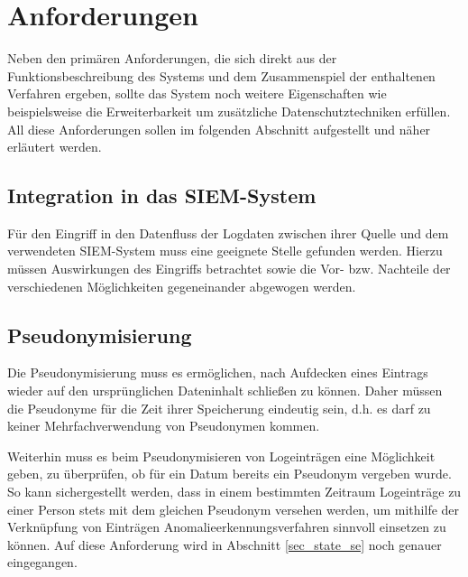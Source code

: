 \section{Anforderungen}

\label{sec_impl_requirements}

Neben den primären Anforderungen, die sich direkt aus der Funktionsbeschreibung des Systems und dem Zusammenspiel der enthaltenen Verfahren ergeben, sollte das System noch weitere Eigenschaften wie beispielsweise die Erweiterbarkeit um zusätzliche Datenschutztechniken erfüllen. All diese Anforderungen sollen im folgenden Abschnitt aufgestellt und näher erläutert werden.

\subsection{Integration in das SIEM-System}

\label{subsec_impl_requirements_ossimintegration}

Für den Eingriff in den Datenfluss der Logdaten zwischen ihrer Quelle und dem verwendeten SIEM-System muss eine geeignete Stelle gefunden werden. Hierzu müssen Auswirkungen des Eingriffs betrachtet sowie die Vor- bzw. Nachteile der verschiedenen Möglichkeiten gegeneinander abgewogen werden. 

\subsection{Pseudonymisierung}

\label{subsec_impl_requirements_pseudonymity}


Die Pseudonymisierung muss es ermöglichen, nach Aufdecken eines Eintrags wieder auf den ursprünglichen Dateninhalt schließen zu können. Daher müssen die Pseudonyme für die Zeit ihrer Speicherung eindeutig sein, d.h. es darf zu keiner Mehrfachverwendung von Pseudonymen kommen. 

Weiterhin muss es beim Pseudonymisieren von Logeinträgen eine Möglichkeit geben, zu überprüfen, ob für ein Datum bereits ein Pseudonym vergeben wurde. So kann sichergestellt werden, dass in einem bestimmten Zeitraum Logeinträge zu einer Person stets mit dem gleichen Pseudonym versehen werden, um mithilfe der Verknüpfung von Einträgen Anomalieerkennungsverfahren sinnvoll einsetzen zu können. Auf diese Anforderung wird in Abschnitt \ref{sec_state_se} noch genauer eingegangen.

